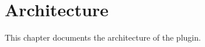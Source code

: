 \section{Architecture} \label{architecture}
This chapter documents the architecture of the plugin.







